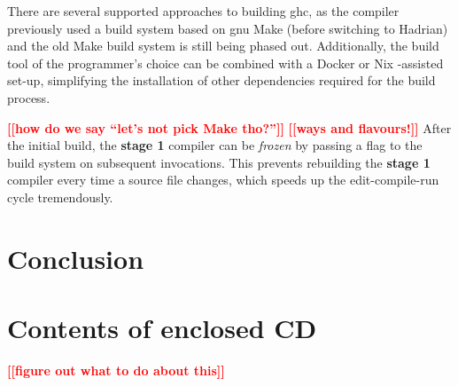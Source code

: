 \documentclass[thesis=B,english]{FITthesis}[2019/12/23]
\newcommand{\todo}[1]{\textcolor{red}{\textbf{[[#1]]}}}
\newcommand{\blind}[1][1]{\textcolor{gray}{\Blindtext[#1][1]}}
\begin{document}
There are several supported approaches to building \acrshort{ghc}, as the
compiler previously used a build system based on \acrshort{gnu} Make (before
switching to Hadrian) and the old Make build system is still being phased out.
Additionally, the build tool of the programmer's choice can be combined with a
Docker or Nix -assisted set-up, simplifying the installation of other
dependencies required for the build process.

\todo{how do we say ``let's not pick Make tho?''}
\todo{ways and flavours!}
After the initial build, the \textbf{stage 1} compiler can be \textit{frozen}
by passing a flag to the build system on subsequent invocations. This prevents
rebuilding the \textbf{stage 1} compiler every time a source file changes, which
speeds up the edit-compile-run cycle tremendously.

\blind[3]




\chapter{Conclusion}

\blind[2]




\appendix

\printglossary[type=\acronymtype]


\chapter{Contents of enclosed CD}

\todo{figure out what to do about this}

\begin{figure}
\end{figure}
\end{document}
